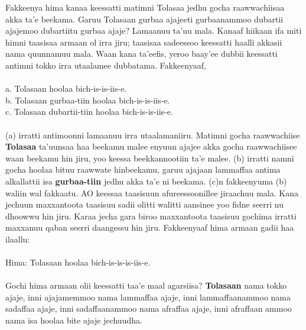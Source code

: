 \documentclass[11pt,b5paper]{book}
\begin{document}
Fakkeenya hima kanaa keessatti matimni Tolasaa jedhu gocha raawwachiisaa akka ta’e beekama. Garuu Tolasaan gurbaa ajajeeti gurbaanammoo dubartii ajajemoo dubartiitu gurbaa ajaje? Lamaanuu ta’uu mala. Kanaaf hiikaan ifa miti himni taasisaa armaan ol irra jiru; taasisaa sadeessoo keessatti haalli
akkasii nama quunnamuu mala. Waan kana ta’eefis, yeroo baay’ee dubbii keessatti antimni tokko irra utaalamee dubbatama. Fakkeenyaaf, \\
\\
a. Tolasaan hoolaa bich-is-is-iis-e.\\
b. Tolasaan gurbaa-tiin hoolaa bich-is-is-iis-e.\\
c. Tolasaan dubartii-tiin hoolaa bich-is-is-iis-e.\\
\\
(a) irratti antimoonni lamaanuu irra utaalamaniiru. Matimni gocha raawwachiise \textbf{Tolasaa} ta’uunsaa haa beekamu malee enyuun ajajee akka gocha raawwachiisee waan beekamu hin jiru, yoo keessa beekkannootiin ta’e malee. (b) irratti namni gocha hoolaa bituu raawwate hinbeekamu, garuu ajajaan
lammaffaa antima alkallattii isa \textbf{gurbaa-tiin} jedhu akka ta’e ni beekama. (c)n fakkeenyuma (b) waliin wal fakkaatu. AO keessaa taasisuun afureessoonillee jiraachuu mala. Kana jechuun maxxantoota taasisuu sadii olitti walitti aansinee yoo fidne seerri nu dhoowwu hin jiru. Karaa jecha gara biroo
maxxantoota taasisuu gochima irratti maxxanuu qaban seerri daangessu hin jiru. Fakkeenyaaf hima armaan gadii haa ilaallu:\\
\\
Hima: Tolasaan hoolaa bich-is-is-is-iis-e. \\
\\
Gochi hima armaan olii keessatti taa’e maal agarsiisa? \textbf{Tolasaan} nama tokko ajaje, inni ajajamemmoo nama lammaffaa ajaje, inni lammaffaanammoo nama sadaffaa ajaje, inni sadaffaanammoo nama afraffaa ajaje, inni afraffaan ammoo nama isa hoolaa bite ajaje jechuudha. 
\end{document}

